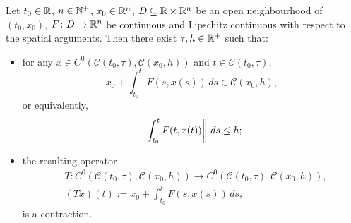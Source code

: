 \begin{proposition}
  Let
    $t_0 \in \mathbb{R}$,
    $n \in \mathbb{N}^+$,
    $x_0 \in \mathbb{R}^n$,
    $D \subseteq \mathbb{R} \times \mathbb{R}^n$ be an open neighbourhood of $(t_0, x_0)$,
    $F \colon D \to \mathbb{R}^n$ be continuous and Lipschitz continuous with respect to
      the spatial arguments.
  Then there exist $\tau, h \in \mathbb{R}^+$ such that:
  \begin{itemize}
    \item
      for any
      $x \in C^0(\mathcal{C}(t_0, \tau), \mathcal{C}(x_0, h))$ and
      $t \in \mathcal{C}(t_0, \tau)$,
      \begin{equation}
        x_0 + \int_{t_0}^t F(s, x(s))\, d s \in \mathcal{C}(x_0, h),
      \end{equation}
      or equivalently,
      \begin{equation}
        \left\lVert\int_{t_0}^t F(t, x(t))\right\rVert\, d s \leq h;
      \end{equation}
    \item
      the resulting operator
      \begin{equation}
        \label{equation:ordinary_differential_equation/initial_value_problem/operator}
        \begin{split}
          & T
            \colon C^0(\mathcal{C}(t_0, \tau), \mathcal{C}(x_0, h))
            \to C^0(\mathcal{C}(t_0, \tau), \mathcal{C}(x_0, h)), \\
          & (T x)(t) := x_0 + \int_{t_0}^t F(s, x(s))\, d s,
        \end{split}
      \end{equation}
      is a contraction.
  \end{itemize}
\end{proposition}

